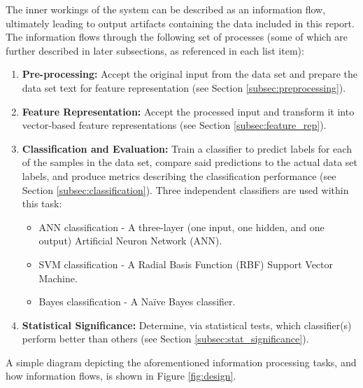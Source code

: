 \documentclass[conference]{sig-alternate-05-2015}
\begin{document}
The inner workings of the system can be described as an information flow,
ultimately leading to output artifacts containing the data included in this
report. The information flows through the following set of processes (some of
which are further described in later subsections, as referenced in each list
item):
\begin{enumerate}
  \item \textbf{Pre-processing:} Accept the original input from the data set and
  prepare the data set text for feature representation (see Section
  \ref{subsec:preprocessing}).
  \item \textbf{Feature Representation:} Accept the processed input and
  transform it into vector-based feature representations (see Section
  \ref{subsec:feature_rep}).
  \item \textbf{Classification and Evaluation:} Train a classifier to predict
  labels for each of the samples in the data set, compare said predictions to
  the actual data set labels, and produce metrics describing the classification
  performance (see Section \ref{subsec:classification}). Three independent
  classifiers are used within this task:
  \begin{itemize}
    \item ANN classification - A three-layer (one input, one hidden, and
    one output) Artificial Neuron Network (ANN).
    \item SVM classification - A Radial Basis Function (RBF) Support Vector
    Machine.
    \item Bayes classification - A Na\"{i}ve Bayes classifier.
  \end{itemize}
  \item \textbf{Statistical Significance:} Determine, via statistical tests,
  which classifier(s) perform better than others (see Section
  \ref{subsec:stat_significance}).
\end{enumerate}

A simple diagram depicting the aforementioned information processing tasks, and
how information flows, is shown in Figure \ref{fig:design}.
\end{document}
